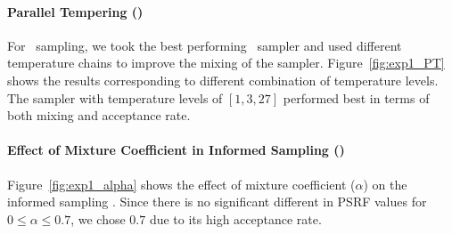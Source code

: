 \paragraph{Parallel Tempering (\PT)}

For \PT~sampling, we took the best performing \MH~sampler and used
different temperature chains to improve the mixing of the
sampler. Figure~\ref{fig:exp1_PT} shows the results corresponding to
different combination of temperature levels. The sampler with
temperature levels of $[1,3,27]$ performed best in terms of both
mixing and acceptance rate.

\paragraph{Effect of Mixture Coefficient in Informed Sampling (\MIXLMH)}

Figure~\ref{fig:exp1_alpha} shows the effect of mixture
coefficient ($\alpha$) on the informed sampling
\MIXLMH. Since there is no significant different in PSRF values for
$0 \le \alpha \le 0.7$, we chose $0.7$ due to its high acceptance
rate.



\begin{figure}[h]
\centering
\\
\end{figure}




